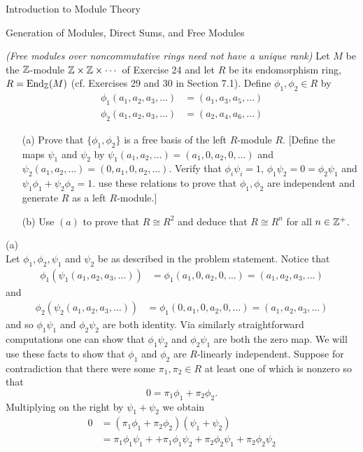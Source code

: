 \begin{chapter}{Introduction to Module Theory}
\begin{section}{Generation of Modules, Direct Sums, and Free Modules}
\begin{problem}\label{ex:10.3.27}
\emph{(Free modules over noncommutative rings need not have a unique rank)} Let $M$ be the $\mathbb{Z}$-module $\mathbb{Z}\times \mathbb{Z}\times \cdots$ of Exercise 24 and let $R$ be its endomorphism ring, $R = \operatorname{End}_{\mathbb{Z}}(M)$ (cf. Exercises 29 and 30 in Section 7.1). Define $\phi_1,\phi_2\in R$ by \begin{align*}
\phi_1(a_1,a_2,a_3,\ldots)&=(a_1,a_3,a_5,\ldots)\\
\phi_2(a_1,a_2,a_3,\ldots)&=(a_2,a_4,a_6,\ldots)
\end{align*}
\begin{enumerate}
\item[(a)] Prove that $\{\phi_1,\phi_2\}$ is a free basis of the left $R$-module $R$. [Define the maps $\psi_1$ and $\psi_2$ by $\psi_1(a_1,a_2,\ldots) =(a_1,0,a_2,0,\ldots)$ and $\psi_2(a_1,a_2,\ldots) =(0,a_1,0,a_2,\ldots)$. Verify that $\phi_i\psi_i = 1$, $\phi_1\psi_2 = 0 = \phi_2\psi_1$ and $\psi_1\phi_1+\psi_2\phi_2 = 1$. use these relations to prove that $\phi_1,\phi_2$ are independent and generate $R$ as a left $R$-module.]
\item[(b)] Use $(a)$ to prove that $R\cong R^2$ and deduce that $R\cong R^n$ for all $n\in \mathbb{Z}^+$.
\end{enumerate}
\end{problem}
\begin{solution}
(a)\\
Let $\phi_1, \phi_2, \psi_1$ and $\psi_2$ be as described in the problem statement. Notice that \begin{align*}
\phi_1(\psi_1(a_1,a_2,a_3,\ldots)) &= \phi_1(a_1,0,a_2,0,\ldots) = (a_1,a_2,a_3,\ldots)
\end{align*}
and \begin{align*}
\phi_2(\psi_2(a_1,a_2,a_3,\ldots)) &= \phi_1(0,a_1,0,a_2,0,\ldots) = (a_1,a_2,a_3,\ldots)
\end{align*}
and so $\phi_1\psi_1$ and $\phi_2\psi_2$ are both identity. Via similarly straightforward computations one can show that $\phi_1\psi_2$ and $\phi_2\psi_1$ are both the zero map. We will use these facts to show that $\phi_1$ and $\phi_2$ are $R$-linearly independent. Suppose for contradiction that there were some $\pi_1, \pi_2\in R$ at least one of which is nonzero so that \[
0 = \pi_1\phi_1 + \pi_2\phi_2.
\]
Multiplying on the right by $\psi_1+\psi_2$ we obtain\begin{align*}
0 &= (\pi_1\phi_1 + \pi_2\phi_2)(\psi_1+\psi_2)\\
&= \pi_1\phi_1\psi_1 + +\pi_1\phi_1\psi_2 + \pi_2\phi_2\psi_1 + \pi_2\phi_2\psi_2\\

\end{align*}
\end{solution}
\end{section}
\end{chapter}

